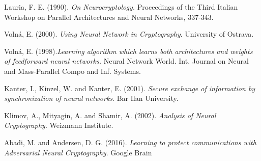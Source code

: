 \documentclass{beamer}
\begin{document}
\begin{frame}
\begin{thebibliography}{99}
 {\sc Lauria, F. E.} (1990). \textit{On Neurocryptology.} Proceedings of the Third Italian Workshop on Parallel Architectures and Neural Networks, 337-343.

 {\sc Volná, E.} (2000). \textit{Using Neural Network in Cryptography}. University of Ostrava.

 {\sc Volná, E.} (1998).\textit{Learning algorithm which learns both architectures and weights of feedforward neural networks.} Neural Network World. Int. Journal on Neural and Mass-Parallel Compo and Inf. Systems.

 {\sc Kanter, I.}, {\sc Kinzel, W.} and {\sc Kanter, E.} (2001). \textit{Secure exchange of information by synchronization of neural networks}. Bar Ilan University.

 {\sc Klimov, A.}, {\sc Mityagin, A.} and {\sc Shamir, A.} (2002). \textit{Analysis of Neural Cryptography}. Weizmann Institute.


 {\sc Abadi, M.} and {\sc Andersen, D. G.} (2016). \textit{Learning to protect communications with Adversarial Neural Cryptography}. Google Brain

\end{thebibliography}
\end{frame}
\end{document}
